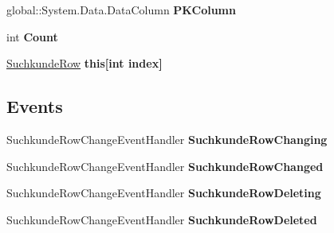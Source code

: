 \begin{DoxyCompactItemize}
\item 
global\+::\+System.\+Data.\+Data\+Column {\bfseries P\+K\+Column}\hypertarget{class_products_1_1_data_1_1ds_sage_1_1_suchkunde_data_table_a085eb470e9958c29cef13145095396b4}{}\label{class_products_1_1_data_1_1ds_sage_1_1_suchkunde_data_table_a085eb470e9958c29cef13145095396b4}

\item 
int {\bfseries Count}\hypertarget{class_products_1_1_data_1_1ds_sage_1_1_suchkunde_data_table_a3e75f93e78c0e1ce944dd66fd869c9f4}{}\label{class_products_1_1_data_1_1ds_sage_1_1_suchkunde_data_table_a3e75f93e78c0e1ce944dd66fd869c9f4}

\item 
\hyperlink{class_products_1_1_data_1_1ds_sage_1_1_suchkunde_row}{Suchkunde\+Row} {\bfseries this\mbox{[}int index\mbox{]}}\hypertarget{class_products_1_1_data_1_1ds_sage_1_1_suchkunde_data_table_afcc7a814adfea29014fb3a9c5aa65ce7}{}\label{class_products_1_1_data_1_1ds_sage_1_1_suchkunde_data_table_afcc7a814adfea29014fb3a9c5aa65ce7}

\end{DoxyCompactItemize}
\subsection*{Events}
\begin{DoxyCompactItemize}
\item 
Suchkunde\+Row\+Change\+Event\+Handler {\bfseries Suchkunde\+Row\+Changing}\hypertarget{class_products_1_1_data_1_1ds_sage_1_1_suchkunde_data_table_a63947fc12d6d1239ec22dc29bfb6eaf2}{}\label{class_products_1_1_data_1_1ds_sage_1_1_suchkunde_data_table_a63947fc12d6d1239ec22dc29bfb6eaf2}

\item 
Suchkunde\+Row\+Change\+Event\+Handler {\bfseries Suchkunde\+Row\+Changed}\hypertarget{class_products_1_1_data_1_1ds_sage_1_1_suchkunde_data_table_a71b5040e5a5cdc6c5f15427ffc3266a1}{}\label{class_products_1_1_data_1_1ds_sage_1_1_suchkunde_data_table_a71b5040e5a5cdc6c5f15427ffc3266a1}

\item 
Suchkunde\+Row\+Change\+Event\+Handler {\bfseries Suchkunde\+Row\+Deleting}\hypertarget{class_products_1_1_data_1_1ds_sage_1_1_suchkunde_data_table_a15a07e6be03a49ed915491ec6f19bbb2}{}\label{class_products_1_1_data_1_1ds_sage_1_1_suchkunde_data_table_a15a07e6be03a49ed915491ec6f19bbb2}

\item 
Suchkunde\+Row\+Change\+Event\+Handler {\bfseries Suchkunde\+Row\+Deleted}\hypertarget{class_products_1_1_data_1_1ds_sage_1_1_suchkunde_data_table_a53a17447aaab563dbd46c97b5fac85bc}{}\label{class_products_1_1_data_1_1ds_sage_1_1_suchkunde_data_table_a53a17447aaab563dbd46c97b5fac85bc}

\end{DoxyCompactItemize}


